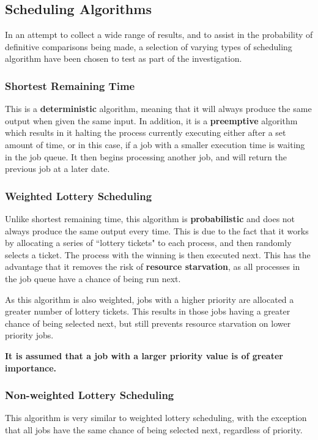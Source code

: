 \documentclass{acm_proc_article-sp}
\begin{document}
\subsection{Scheduling Algorithms}
In an attempt to collect a wide range of results, and to assist in the probability of definitive comparisons being made, a selection of varying types of scheduling algorithm have been chosen to test as part of the investigation. 

\subsubsection{Shortest Remaining Time}
This is a \textbf{deterministic} algorithm, meaning that it will always produce the same output when given the same input. In addition, it is a \textbf{preemptive} algorithm which results in it halting the process currently executing either after a set amount of time, or in this case, if a job with a smaller execution time is waiting in the job queue. It then begins processing another job, and will return the previous job at a later date. 

\subsubsection{Weighted Lottery Scheduling}
Unlike shortest remaining time, this algorithm is \textbf{probabilistic} and does not always produce the same output every time. This is due to the fact that it works by allocating a series of ``lottery tickets" to each process, and then randomly selects a ticket. The process with the winning is then executed next. This has the advantage that it removes the risk of \textbf{resource starvation}, as all processes in the job queue have a chance of being run next. 

As this algorithm is also weighted, jobs with a higher priority are allocated a greater number of lottery tickets. This results in those jobs having a greater chance of being selected next, but still prevents resource starvation on lower priority jobs.  

\textbf{It is assumed that a job with a larger priority value is of greater importance.}

\subsubsection{Non-weighted Lottery Scheduling}
This algorithm is very similar to weighted lottery scheduling, with the exception that all jobs have the same chance of being selected next, regardless of priority. 
\end{document}
